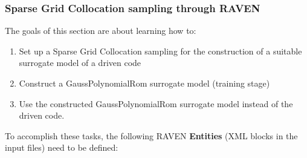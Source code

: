\subsubsection{Sparse Grid Collocation sampling through RAVEN}
\label{subsub:SGcsamplingExample}
The goals of this section are about learning how to:
 \begin{enumerate}
   \item Set up a Sparse Grid Collocation sampling for the construction of a suitable surrogate model of a driven code
   \item Construct a GaussPolynomialRom surrogate model (training stage)
   \item Use the constructed GaussPolynomialRom surrogate model instead of the driven code.
\end{enumerate}  
To accomplish these tasks, the following RAVEN \textbf{Entities} (XML blocks in the input files) need to be defined:
